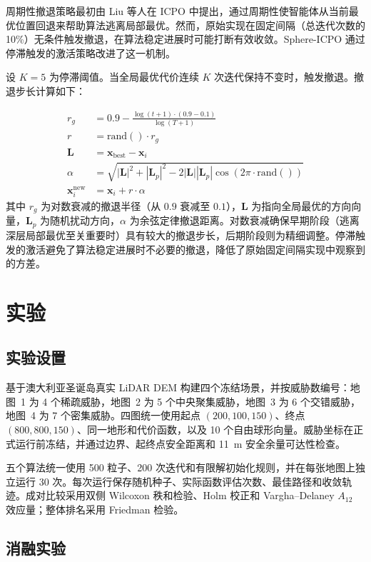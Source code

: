 \documentclass[11pt,a4paper]{ctexart}
\begin{document}
周期性撤退策略最初由 Liu 等人在 ICPO 中提出，通过周期性使智能体从当前最优位置回退来帮助算法逃离局部最优。然而，原始实现在固定间隔（总迭代次数的 10\%）无条件触发撤退，在算法稳定进展时可能打断有效收敛。Sphere-ICPO 通过停滞触发的激活策略改进了这一机制。

设 $K = 5$ 为停滞阈值。当全局最优代价连续 $K$ 次迭代保持不变时，触发撤退。撤退步长计算如下：

\begin{align}
    r_g &= 0.9 - \frac{\log(t+1) \cdot (0.9 - 0.1)}{\log(T+1)} \label{eq:rg} \\
    r &= \text{rand}() \cdot r_g \\
    \mathbf{L} &= \mathbf{x}_{\text{best}} - \mathbf{x}_i \\
    \alpha &= \sqrt{|\mathbf{L}|^2 + |\mathbf{L}_p|^2 - 2|\mathbf{L}||\mathbf{L}_p|\cos(2\pi \cdot \text{rand}())} \\
    \mathbf{x}_i^{\text{new}} &= \mathbf{x}_i + r \cdot \alpha
\end{align}
其中 $r_g$ 为对数衰减的撤退半径（从 $0.9$ 衰减至 $0.1$），$\mathbf{L}$ 为指向全局最优的方向向量，$\mathbf{L}_p$ 为随机扰动方向，$\alpha$ 为余弦定律撤退距离。对数衰减确保早期阶段（逃离深层局部最优至关重要时）具有较大的撤退步长，后期阶段则为精细调整。停滞触发的激活避免了算法稳定进展时不必要的撤退，降低了原始固定间隔实现中观察到的方差。

\section{实验}

\subsection{实验设置}

基于澳大利亚圣诞岛真实 LiDAR DEM 构建四个冻结场景，并按威胁数编号：地图~1 为 4 个稀疏威胁，地图~2 为 5 个中央聚集威胁，地图~3 为 6 个交错威胁，地图~4 为 7 个密集威胁。四图统一使用起点 $(200,100,150)$、终点 $(800,800,150)$、同一地形和代价函数，以及 10 个自由球形向量。威胁坐标在正式运行前冻结，并通过边界、起终点安全距离和 11~m 安全余量可达性检查。

五个算法统一使用 500 粒子、200 次迭代和有限解初始化规则，并在每张地图上独立运行 30 次。每次运行保存随机种子、实际函数评估次数、最佳路径和收敛轨迹。成对比较采用双侧 Wilcoxon 秩和检验、Holm 校正和 Vargha--Delaney $A_{12}$ 效应量；整体排名采用 Friedman 检验。

\subsection{消融实验}
\end{document}

